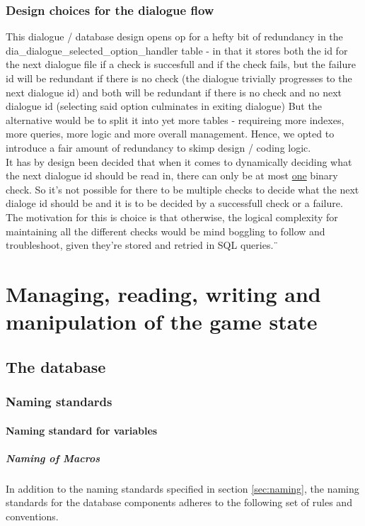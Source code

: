 \documentclass{report}
\begin{document}
\subsubsection*{Design choices for the dialogue flow}
This dialogue / database design opens op for a hefty bit of redundancy in the dia\_dialogue\_selected\_option\_handler table - in that it stores both the id for the next dialogue file if a check is succesfull and if the check fails, but the failure id will be redundant if there is no check (the dialogue trivially progresses to the next dialogue id) and both will be redundant if there is no check and no next dialogue id (selecting said option culminates in exiting dialogue) But the alternative would be to split it into yet more tables - requireing more indexes, more queries, more logic and more overall management. Hence, we opted to introduce a fair amount of redundancy to skimp design / coding logic. \\

It has by design been decided that when it comes to dynamically deciding what the next dialogue id should be read in, there can only be at most \underline{one} binary check. So it's not possible for there to be multiple checks to decide what the next dialoge id should be and it is to be decided by a successfull check or a failure. The motivation for this is choice is that otherwise, the logical complexity for maintaining all the different checks would be mind boggling to follow and troubleshoot, given they're stored and retried in SQL queries.¨

\section*{Managing, reading, writing and manipulation of the game state}
\subsection*{The database}
\subsubsection*{Naming standards}
\paragraph*{Naming standard for variables}
\subparagraph*{Naming of Macros}
In addition to the naming standards specified in section \ref{sec:naming}, the naming standards for the database components adheres to the following set of rules and conventions. \newline
\end{document}
